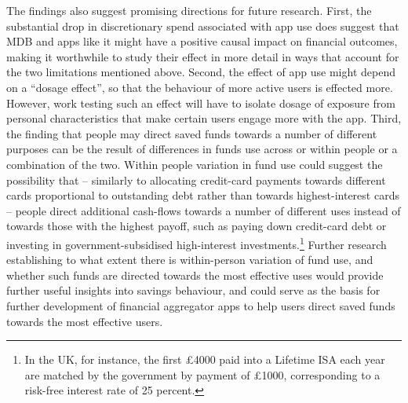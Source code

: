 The findings also suggest promising directions for future research. First, the
substantial drop in discretionary spend associated with app use does suggest
that MDB and apps like it might have a positive causal impact on financial
outcomes, making it worthwhile to study their effect in more detail in ways
that account for the two limitations mentioned above. Second, the effect of app
use might depend on a ``dosage effect'', so that the behaviour of more active
users is effected more. However, work testing such an effect will have to
isolate dosage of exposure from personal characteristics that make certain
users engage more with the app. Third, the finding that people may direct saved
funds towards a number of different purposes can be the result of differences
in funds use across or within people or a combination of the two. Within people
variation in fund use could suggest the possibility that -- similarly to
allocating credit-card payments towards different cards proportional to
outstanding debt rather than towards highest-interest cards
\citet{gathergood2019individuals} -- people direct additional cash-flows
towards a number of different uses instead of towards those with the highest
payoff, such as paying down credit-card debt or investing in
government-subsidised high-interest investments.\footnote{In the UK, for
    instance, the first \pounds4000 paid into a Lifetime ISA each year are
matched by the government by payment of \pounds1000, corresponding to a
risk-free interest rate of 25 percent.} Further research establishing to what
extent there is within-person variation of fund use, and whether such funds are
directed towards the most effective uses would provide further useful insights
into savings behaviour, and could serve as the basis for further development of
financial aggregator apps to help users direct saved funds towards the most
effective users.


